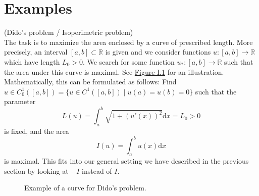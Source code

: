 \section{Examples}
\begin{example}
(Dido's problem / Isoperimetric problem)\\
The task is to maximize the area enclosed by a curve of prescribed length. More precisely, an interval $[a,b]\subset\mathbb{R}$ is given and we consider functions $u:[a,b]\longrightarrow\mathbb{R}$ which have length $L_0>0$. We search for some function $u_*:[a,b]\longrightarrow\mathbb{R}$ such that the area under this curve is maximal. See \hyperref[fig:example_1_2_1]{Figure I.1} for an illustration. Mathematically, this can be formulated as follows: Find $u\in C_0^1([a,b])=\{u\in C^1([a,b])\mid u(a)=u(b)=0\}$ such that the parameter
\[L(u)=\int_a^b{\sqrt{1+(u'(x))^2}\mathrm{d}x}=L_0>0\]
is fixed, and the area
\[I(u)=\int_a^b{u(x)\mathrm{d}x}\]
is maximal. This fits into our general setting we have described in the previous section by looking at $-I$ instead of $I$.\\[11pt]

\begin{figure}
	\centering
	\caption{Example of a curve for Dido's problem.}
	\label{fig:example_1_2_1}
\end{figure}
\end{example}


